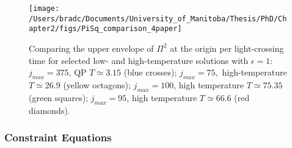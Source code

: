 \documentclass[../PhD.tex]{subfiles}
\begin{document}
\begin{figure}[h]
	\centering
	\texttt{[image: /Users/bradc/Documents/University\_of\_Manitoba/Thesis/PhD/Chapter2/figs/PiSq\_comparison\_4paper]}
	\caption{Comparing the upper envelope of $\Pi^2$ at the origin per light-crossing time for selected low- and high-temperature solutions with $\epsilon = 1$: $j_{max} = 375$, QP $T \simeq 3.15$ (blue crosses); $j_{max} = 75,$ high-temperature $T \simeq 26.9$ (yellow octagons); $j_{max} = 100$, high temperature $T \simeq 75.35$ (green squares); $j_{max} = 95$, high temperature $T \simeq 66.6$ (red diamonds).}
	\label{fig: compare Pi sq}
\end{figure}


\subsubsection{Constraint Equations}
\end{document}
